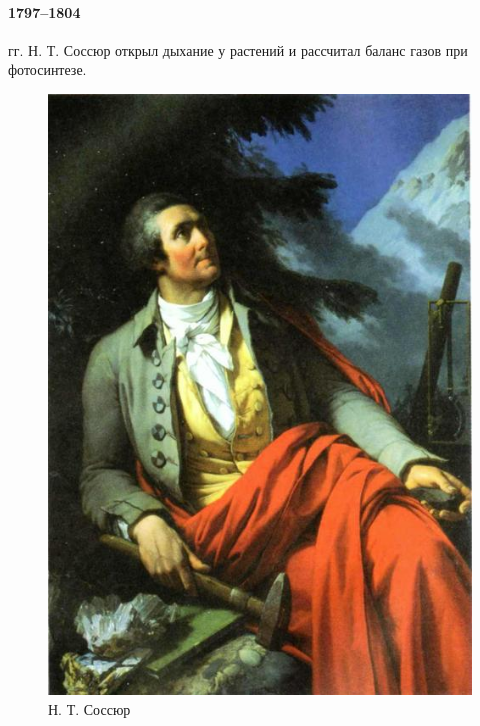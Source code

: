 \begin{figure}[h]
\begin{minipage}[h]{0.49\linewidth}
\end{minipage}
\label{ris_2}
\end{figure}


\paragraph*{1797–1804} гг. Н. Т. Соссюр открыл дыхание у растений и рассчитал баланс газов при фотосинтезе. 

\begin{figure}
  \centering
       \includegraphics[width=0.35\linewidth]{pictures/saussr}
\caption{Н. Т. Соссюр}
\label{saussr}
\end{figure}

